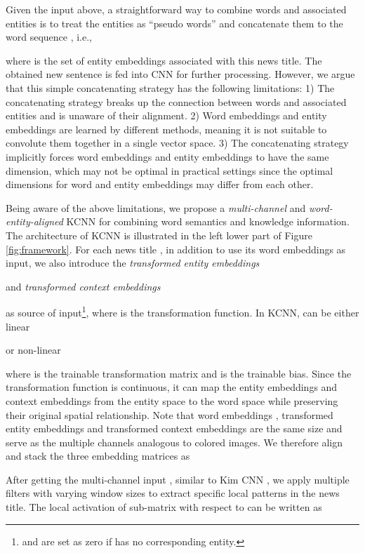 \documentclass[sigconf]{acmart}
\begin{document}
		Given the input above, a straightforward way to combine words and associated entities is to treat the entities as ``pseudo words'' and concatenate them to the word sequence \cite{wang2017combining}, i.e.,
		
		where  is the set of entity embeddings associated with this news title.
		The obtained new sentence  is fed into CNN \cite{kim2014convolutional} for further processing.
		However, we argue that this simple concatenating strategy has the following limitations:
		1) The concatenating strategy breaks up the connection between words and associated entities and is unaware of their alignment.
		2) Word embeddings and entity embeddings are learned by different methods, meaning it is not suitable to convolute them together in a single vector space.
		3) The concatenating strategy implicitly forces word embeddings and entity embeddings to have the same dimension, which may not be optimal in practical settings since the optimal dimensions for word  and entity embeddings may differ from each other.
		
		Being aware of the above limitations, we propose a \textit{multi-channel} and \textit{word-entity-aligned} KCNN for combining word semantics and knowledge information.
		The architecture of KCNN is illustrated in the left lower part of Figure \ref{fig:framework}.
		For each news title , in addition to use its word embeddings  as input, we also introduce the \textit{transformed entity embeddings}
		
		and \textit{transformed context embeddings}
		
		as source of input\footnote{ and  are set as zero if  has no corresponding entity.}, where  is the transformation function.
		In KCNN,  can be either linear
		
		or non-linear
		
		where  is the trainable transformation matrix and  is the trainable bias.
		Since the transformation function is continuous, it can map the entity embeddings and context embeddings from the entity space to the word space while preserving their original spatial relationship.
		Note that word embeddings , transformed entity embeddings  and transformed context embeddings  are the same size and serve as the multiple channels analogous to colored images. We therefore align and stack the three embedding matrices as
		
		
		After getting the multi-channel input , similar to Kim CNN \cite{kim2014convolutional}, we apply multiple filters  with varying window sizes  to extract specific local patterns in the news title.
		The local activation of sub-matrix  with respect to  can be written as
		
\end{document}
